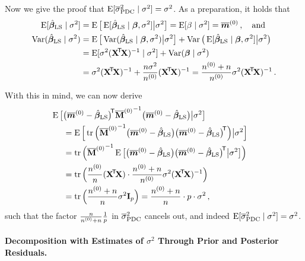 Now we give the proof that $\operatorname{E}[\overline{\sigma}^2_\text{PDC}\mid\sigma^2] = \sigma^2$.
As a preparation, it holds that
\begin{align*}
\E[\bls\mid\sigma^2] &= \E\big[ \E[\bls\mid\bbeta, \sigma^2] \big| \sigma^2 \big]
                      = \E[\beta\mid\sigma^2] = \tmz\,, \quad\text{and} \\
\V(\bls\mid\sigma^2) &= \E\big[ \V(\bls\mid\bbeta, \sigma^2) \big| \sigma^2 \big]
                       +\V\big( \E[\bls\mid\bbeta, \sigma^2] \big| \sigma^2 \big) \\
                     &= \E[\sigma^2 (\XtX)^{-1} \mid\sigma^2]
                       +\V(\bbeta\mid\sigma^2) \\
                     &= \sigma^2 (\XtX)^{-1} + \frac{n\sigma^2}{\nz} (\XtX)^{-1}
                      = \frac{\nz + n}{\nz} \sigma^2 (\XtX)^{-1} \,.
\end{align*}

With this in mind, we can now derive
\begin{align*}
\lefteqn{
\E\big[ \big(\tmz - \bls\big)^\tra {\tMz}^{-1} \big(\tmz - \bls\big) \big| \sigma^2 \big] } \hspace*{3ex} \\
    &= \E\Big[ \tr\Big({\tMz}^{-1} \big(\tmz - \bls\big) \big(\tmz - \bls\big)^\tra \Big) \big| \sigma^2 \Big] \\
    &= \tr\Big( {\tMz}^{-1} \E\big[ \big(\tmz - \bls\big) \big(\tmz - \bls\big)^\tra \big| \sigma^2 \big] \Big) \\
    &= \tr\Big( \frac{\nz}{n}(\XtX) \cdot \frac{\nz + n}{\nz} \sigma^2 (\XtX)^{-1} \Big) \\
    &= \tr\Big( \frac{\nz + n}{n} \sigma^2 \mbf{I}_p \Big) = \frac{\nz + n}{n} \cdot p \cdot \sigma^2 \,,
\end{align*}
such that the factor $\frac{n}{n^{(0)} + n} \frac{1}{p}$ in $\overline{\sigma}^2_\text{PDC}$ cancels out, and indeed $\operatorname{E}[\overline{\sigma}^2_\text{PDC}\mid\sigma^2] = \sigma^2$.

\paragraph{Decomposition with Estimates of \texorpdfstring{$\sigma^2$}{sigma2} Through Prior and Posterior Residuals.}


